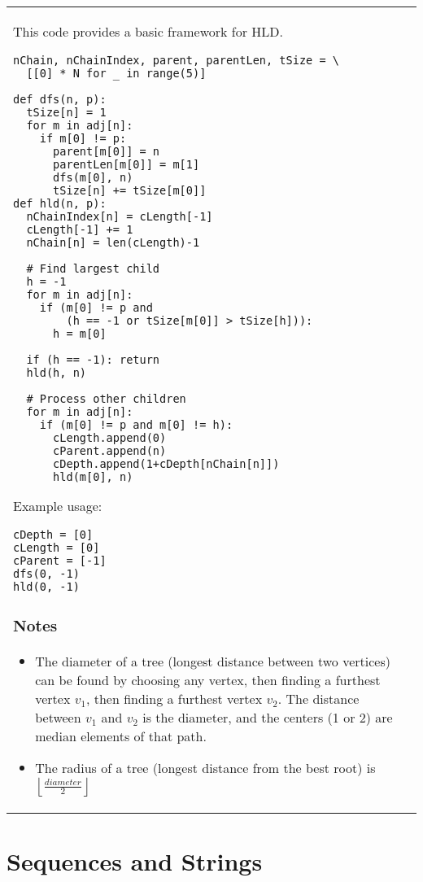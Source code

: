 \documentclass[letterpaper]{article}
\begin{document}
\begin{tabular}{@{}p{9cm}p{9cm}@{}}
    This code provides a basic framework for HLD.

    \begin{lstlisting}
nChain, nChainIndex, parent, parentLen, tSize = \
  [[0] * N for _ in range(5)]

def dfs(n, p):
  tSize[n] = 1
  for m in adj[n]:
    if m[0] != p:
      parent[m[0]] = n
      parentLen[m[0]] = m[1]
      dfs(m[0], n)
      tSize[n] += tSize[m[0]]
def hld(n, p):
  nChainIndex[n] = cLength[-1]
  cLength[-1] += 1
  nChain[n] = len(cLength)-1

  # Find largest child
  h = -1
  for m in adj[n]:
    if (m[0] != p and
        (h == -1 or tSize[m[0]] > tSize[h])):
      h = m[0]

  if (h == -1): return
  hld(h, n)

  # Process other children
  for m in adj[n]:
    if (m[0] != p and m[0] != h):
      cLength.append(0)
      cParent.append(n)
      cDepth.append(1+cDepth[nChain[n]])
      hld(m[0], n)
\end{lstlisting}

    Example usage:

    \begin{lstlisting}
cDepth = [0]
cLength = [0]
cParent = [-1]
dfs(0, -1)
hld(0, -1)
\end{lstlisting}

    \subsubsection{Notes}

    \begin{itemize}
        \item The diameter of a tree (longest distance between two vertices) can be found by choosing any vertex, then finding a furthest vertex $v_1$, then finding a furthest vertex $v_2$. The distance between $v_1$ and $v_2$ is the diameter, and the centers (1 or 2) are median elements of that path.
        \item The radius of a tree (longest distance from the best root) is $\left\lfloor\frac{diameter}2\right\rfloor$
    \end{itemize}
\end{tabular}

\clearpage

\section{Sequences and Strings}
\end{document}
